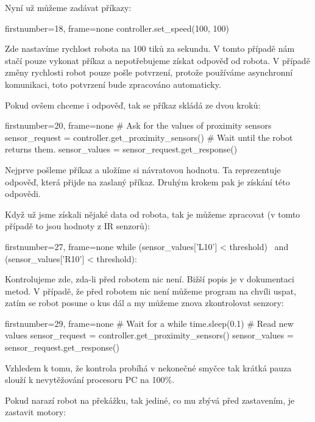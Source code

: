 \documentclass[12pt,notitlepage]{report}
\begin{document}
    Nyní už můžeme zadávat příkazy:

    \begin{pyc*}{firstnumber=18, frame=none}
controller.set_speed(100, 100)
    \end{pyc*}

    Zde nastavíme rychlost robota na 100 tiků za sekundu. V tomto případě nám
    stačí pouze vykonat příkaz a nepotřebujeme získat odpověď od robota. V
    případě změny rychlosti robot pouze pošle potvrzení, protože používáme
    asynchronní komunikaci, toto potvrzení bude zpracováno automaticky.

    Pokud ovšem chceme i odpověď, tak se příkaz skládá ze dvou kroků:

    \begin{pyc*}{firstnumber=20, frame=none}
# Ask for the values of proximity sensors
sensor_request = controller.get_proximity_sensors()
# Wait until the robot returns them.
sensor_values = sensor_request.get_response()
    \end{pyc*}

    Nejprve pošleme příkaz a uložíme si návratovou hodnotu. Ta reprezentuje
    odpověď, která přijde na zaslaný příkaz. Druhým krokem pak je získání této
    odpovědi.

    Když už jsme získali nějaké data od robota, tak je můžeme zpracovat (v
    tomto případě to jsou hodnoty z IR senzorů):

    \begin{pyc*}{firstnumber=27, frame=none}
while (sensor_values['L10'] < threshold) \
       and (sensor_values['R10'] < threshold):
    \end{pyc*}

    Kontrolujeme zde, zda-li  před robotem nic není. Bižší popis je v
    dokumentaci metod. V případě, že před robotem nic není můžeme program na
    chvíli uspat, zatím se robot posune o kus dál a my můžeme znova
    zkontrolovat senzory:

    \begin{pyc*}{firstnumber=29, frame=none}
    # Wait for a while
    time.sleep(0.1)
    # Read new values
    sensor_request = controller.get_proximity_sensors()
    sensor_values = sensor_request.get_response()
    \end{pyc*}

    Vzhledem k tomu, že kontrola probíhá v nekonečné smyčce tak krátká pauza
    slouží k nevytěžování procesoru PC na 100\%.

    Pokud narazí robot na překážku, tak jediné, co mu zbývá před zastavením, je
    zastavit motory:
\end{document}
